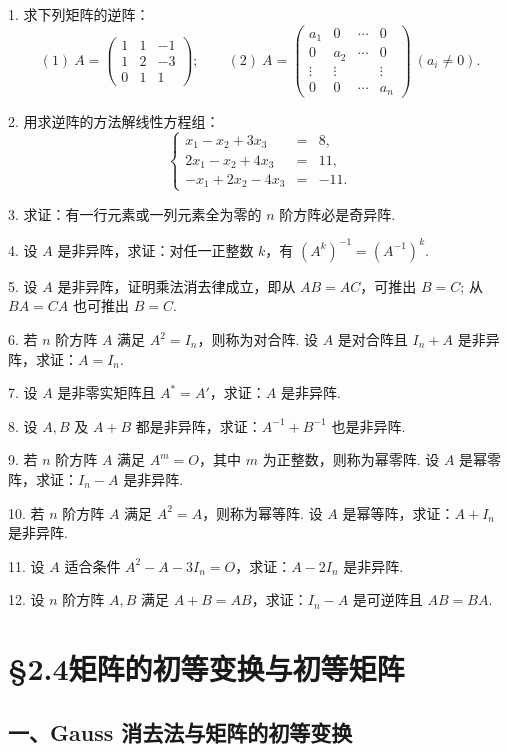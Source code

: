 \documentclass[UTF8, 12pt, fontset=fandol, oneside]{ctexart}
\begin{document}
1. 求下列矩阵的逆阵：
\[
(1)\ A=\left(\begin{array}{ccc}
1 & 1 & -1\\
1 & 2 & -3\\
0 & 1 & 1
\end{array}\right);
\qquad
(2)\ A=\left(\begin{array}{cccc}
a_1 & 0 & \cdots & 0\\
0 & a_2 & \cdots & 0\\
\vdots & \vdots & & \vdots\\
0 & 0 & \cdots & a_n
\end{array}\right)\ (a_i\ne 0).
\]

2. 用求逆阵的方法解线性方程组：
\[
\left\{\begin{array}{rcl}
x_1-x_2+3x_3&=&8,\\
2x_1-x_2+4x_3&=&11,\\
-x_1+2x_2-4x_3&=&-11.
\end{array}\right.
\]

3. 求证：有一行元素或一列元素全为零的 $n$ 阶方阵必是奇异阵.

4. 设 $A$ 是非异阵，求证：对任一正整数 $k$，有 $(A^k)^{-1}=(A^{-1})^k$.

5. 设 $A$ 是非异阵，证明乘法消去律成立，即从 $AB=AC$，可推出 $B=C$; 从 $BA=CA$ 也可推出 $B=C$.

6. 若 $n$ 阶方阵 $A$ 满足 $A^2=I_n$，则称为对合阵. 设 $A$ 是对合阵且 $I_n+A$ 是非异阵，求证：$A=I_n$.

7. 设 $A$ 是非零实矩阵且 $A^*=A'$，求证：$A$ 是非异阵.

8. 设 $A,B$ 及 $A+B$ 都是非异阵，求证：$A^{-1}+B^{-1}$ 也是非异阵.

9. 若 $n$ 阶方阵 $A$ 满足 $A^m=O$，其中 $m$ 为正整数，则称为幂零阵. 设 $A$ 是幂零阵，求证：$I_n-A$ 是非异阵.

10. 若 $n$ 阶方阵 $A$ 满足 $A^2=A$，则称为幂等阵. 设 $A$ 是幂等阵，求证：$A+I_n$ 是非异阵.

11. 设 $A$ 适合条件 $A^2-A-3I_n=O$，求证：$A-2I_n$ 是非异阵.

12. 设 $n$ 阶方阵 $A,B$ 满足 $A+B=AB$，求证：$I_n-A$ 是可逆阵且 $AB=BA$.

\section*{§2.4\quad 矩阵的初等变换与初等矩阵}

\subsection*{一、Gauss 消去法与矩阵的初等变换}
\end{document}
